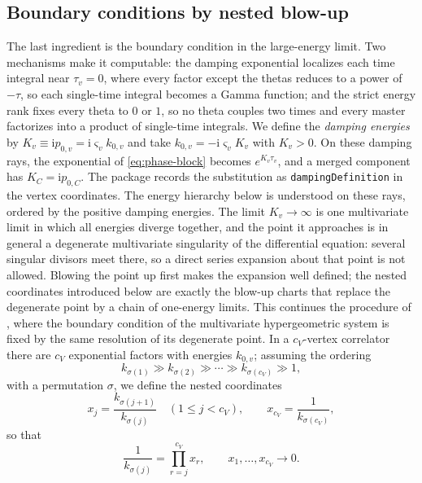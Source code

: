 \documentclass[11pt,a4paper]{article}
\numberwithin{table}{section}
\newcommand{\ii}{\mathrm i}
\begin{document}
\subsection{Boundary conditions by nested blow-up}
\label{sec:boundary}
The last ingredient is the boundary condition in the large-energy limit. Two mechanisms make
it computable: the damping exponential localizes each time integral near $\tau_v=0$, where
every factor except the thetas reduces to a power of $-\tau$, so each single-time integral
becomes a Gamma function; and the strict energy rank fixes every theta to $0$ or $1$, so no
theta couples two times and every master factorizes into a product of single-time integrals.
We define the \emph{damping energies} by $K_v\equiv\ii p_{0,v}=\ii\varsigma_vk_{0,v}$ and take
$k_{0,v}=-\ii\varsigma_vK_v$ with $K_v>0$. On these damping rays, the exponential of
\eqref{eq:phase-block} becomes $e^{K_v\tau_v}$, and a merged component has
$K_C=\ii p_{0,C}$. The package records the substitution as \texttt{dampingDefinition}
in the vertex coordinates. The energy hierarchy below is understood on these rays,
ordered by the positive damping energies.
The limit $K_v\to\infty$ is one multivariate limit in
which all energies diverge together, and the point it approaches is in general a degenerate
multivariate singularity of the differential equation: several singular divisors meet there, so a
direct series expansion about that point is not allowed. Blowing the point up first makes the
expansion well defined; the nested coordinates introduced below are exactly the blow-up charts
that replace the degenerate point by a chain of one-energy limits. This continues the procedure of
\cite{Chen:2024glu}, where the boundary condition of the multivariate hypergeometric system is
fixed by the same resolution of its degenerate point. In a $c_V$-vertex correlator there are $c_V$
exponential factors with energies $k_{0,v}$; assuming the ordering
\begin{equation}
  k_{\sigma(1)}\gg k_{\sigma(2)}\gg\cdots\gg k_{\sigma(c_V)}\gg1,
  \label{eq:energy-rank}
\end{equation}
with a permutation $\sigma$, we define the nested coordinates
\begin{equation}
  x_j=\frac{k_{\sigma(j+1)}}{k_{\sigma(j)}}\quad(1\leq j<c_V),
  \qquad
  x_{c_V}=\frac1{k_{\sigma(c_V)}},
  \label{eq:nested-blowup-coordinates}
\end{equation}
so that
\begin{equation}
 \frac{1}{k_{\sigma(j)}}=\prod_{r=j}^{c_V}x_r,
 \qquad x_1,\ldots,x_{c_V}\longrightarrow0.
 \label{eq:nested-energy-inverse}
\end{equation}
\end{document}
